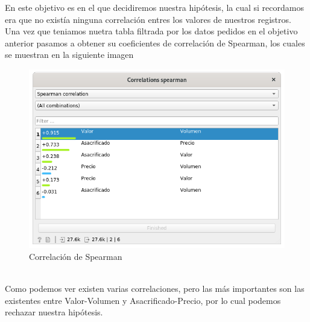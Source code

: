 \item En este objetivo es en el que decidiremos nuestra hipótesis, la cual si recordamos era que no existía ninguna correlación entres los valores de nuestros registros.\\
Una vez que teniamos nuetra tabla filtrada por los datos pedidos en el objetivo anterior pasamos a obtener su coeficientes de correlación de Spearman, los cuales se muestran en la siguiente imagen \\
            \begin{figure}[h]
                \centering
                \includegraphics[scale = 0.3]{imagenes/correlacion.png}
                \caption{Correlación de Spearman}
                \label{correlacion}
            \end{figure}
\\Como podemos ver existen varias correlaciones, pero las más importantes son las existentes entre Valor-Volumen y Asacrificado-Precio, por lo cual podemos rechazar nuestra hipótesis.